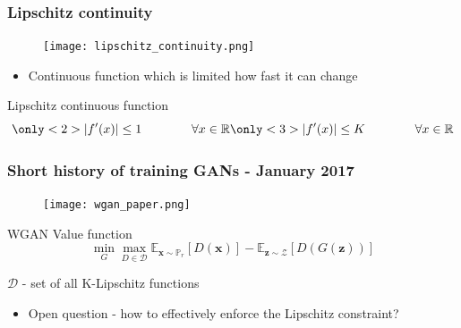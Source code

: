 \documentclass{Bredelebeamer}
\begin{document}
\begin{frame}
	\frametitle{Lipschitz continuity}
	\begin{figure}[h!]
		\centering
		\texttt{[image: lipschitz\_continuity.png]}
	\end{figure}
	\pause
	\begin{itemize}
		\item Continuous function which is limited how fast it can change
	\end{itemize}
	\begin{exampleblock}{Lipschitz continuous function}
	\[
		\only<2>{\vert f'(x)\vert \leq 1 \qquad \qquad \forall x \in \mathbb{R}}
		\only<3>{\vert f'(x)\vert \leq K \qquad \qquad \forall x \in \mathbb{R}}
	\]
	\end{exampleblock}

\end{frame}


\begin{frame}
	\frametitle{Short history of training GANs - January 2017}
	\begin{figure}[h!]
		\centering
		\texttt{[image: wgan\_paper.png]}
	\end{figure}
	\begin{exampleblock}{WGAN Value function}
	\[
		\min_G \max_{D \in \mathcal{D}} \mathbb{E}_{\bm{x} \sim \mathbb{P}_r} \left[ D(\bm{x}) \right] - \mathbb{E}_{\bm{z} \sim \mathcal{Z}} \left[ D(G(\bm{z}))  \right]
	\]
	\begin{center}
		$\mathcal{D}$ - set of all K-Lipschitz functions
	\end{center}
	\end{exampleblock}
	\pause
	\begin{itemize}
		\item Open question - how to effectively enforce the Lipschitz constraint?
	\end{itemize}
\end{frame}

\end{document}

